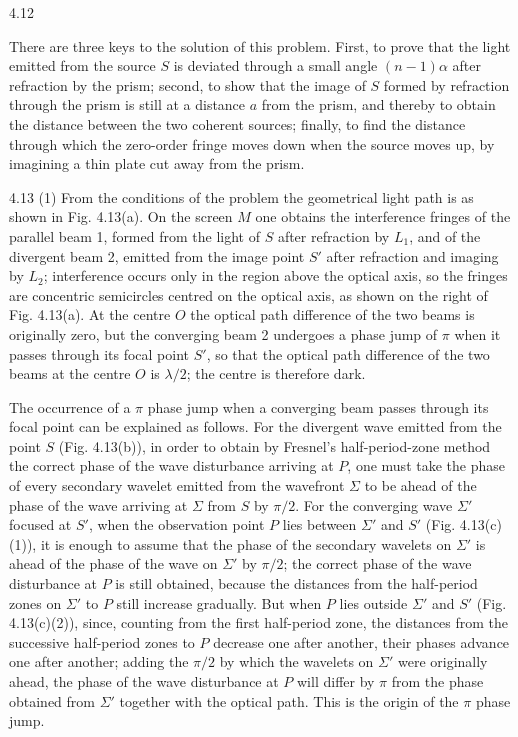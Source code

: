 \begin{solution}{4.12}
\begin{commentary}
There are three keys to the solution of this problem. First, to prove that the light emitted from
the source $S$ is deviated through a small angle $(n-1)\alpha$ after refraction by the prism;
second, to show that the image of $S$ formed by refraction through the prism is still at a distance
$a$ from the prism, and thereby to obtain the distance between the two coherent sources; finally,
to find the distance through which the zero-order fringe moves down when the source moves up, by
imagining a thin plate cut away from the prism.
\end{commentary}
\end{solution}

\begin{solution}{4.13}
(1) From the conditions of the problem the geometrical light path is as shown in Fig. 4.13(a).
On the screen $M$ one obtains the interference fringes of the parallel beam 1, formed from the
light of $S$ after refraction by $L_1$, and of the divergent beam 2, emitted from the image
point $S'$ after refraction and imaging by $L_2$; interference occurs only in the region above
the optical axis, so the fringes are concentric semicircles centred on the optical axis, as
shown on the right of Fig. 4.13(a). At the centre $O$ the optical path difference of the two
beams is originally zero, but the converging beam 2 undergoes a phase jump of $\pi$ when it
passes through its focal point $S'$, so that the optical path difference of the two beams at
the centre $O$ is $\lambda/2$; the centre is therefore dark.

The occurrence of a $\pi$ phase jump when a converging beam passes through its focal point can
be explained as follows. For the divergent wave emitted from the point $S$ (Fig. 4.13(b)), in
order to obtain by Fresnel's half-period-zone method the correct phase of the wave disturbance
arriving at $P$, one must take the phase of every secondary wavelet emitted from the wavefront
$\Sigma$ to be ahead of the phase of the wave arriving at $\Sigma$ from $S$ by $\pi/2$. For the
converging wave $\Sigma'$ focused at $S'$, when the observation point $P$ lies between $\Sigma'$
and $S'$ (Fig. 4.13(c)(1)), it is enough to assume that the phase of the secondary wavelets on
$\Sigma'$ is ahead of the phase of the wave on $\Sigma'$ by $\pi/2$; the correct phase of the
wave disturbance at $P$ is still obtained, because the distances from the half-period zones on
$\Sigma'$ to $P$ still increase gradually. But when $P$ lies outside $\Sigma'$ and $S'$
(Fig. 4.13(c)(2)), since, counting from the first half-period zone, the distances from the
successive half-period zones to $P$ decrease one after another, their phases advance one after
another; adding the $\pi/2$ by which the wavelets on $\Sigma'$ were originally ahead, the phase
of the wave disturbance at $P$ will differ by $\pi$ from the phase obtained from $\Sigma'$
together with the optical path. This is the origin of the $\pi$ phase jump.


\end{solution}
